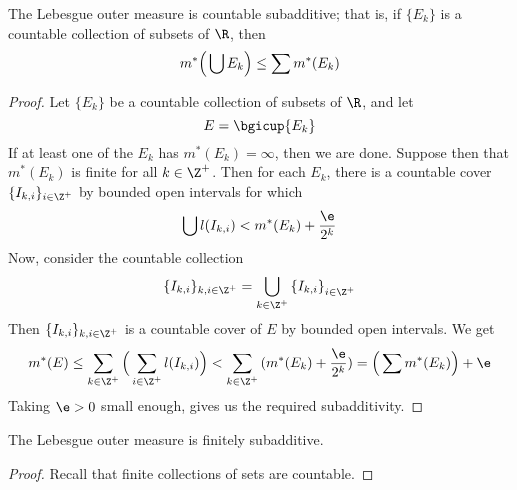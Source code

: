 \begin{lemma}\label{8.2.6}
    The Lebesgue outer measure is countable subadditive; that is, if $\{E_k\}$
    is a countable collection of subsets of $\R$, then
    \begin{equation*}
        m^\ast\Big{(} \bigcup{E_k} \Big{)} \leq \sum{m^\ast(E_k)}
    \end{equation*}
\end{lemma}
\begin{proof}
    Let $\{E_k\}$ be a countable collection of subsets of $\R$, and let
    \begin{equation*}
        E=\bgicup{E_k}
    \end{equation*}
    If at least one of the $E_k$ has  $m^\ast(E_k)=\infty$, then we are done.
    Suppose then that $m^\ast(E_k)$ is finite for all $k \in \Z^+$. Then for
    each  $E_k$, there is a countable cover  $\{I_{k,i}\}_{i \in \Z^+}$ by
    bounded open intervals for which
    \begin{equation*}
        \bigcup{l(I_{k,i})}<m^\ast(E_k)+\frac{\e}{2^k}
    \end{equation*}
    Now, consider the countable collection
    \begin{equation*}
        \{I_{k,i}\}_{k,i \in \Z^+}=\bigcup_{k \in \Z^+}{\{I_{k,i}\}}_{i \in \Z^+}
    \end{equation*}
    Then $\{I_{k,i}\}_{k,i \in \Z^+}$ is a countable cover of $E$ by bounded
    open intervals. We get
    \begin{equation*}
        m^\ast(E) \leq
        \sum_{k \in \Z^+}{\Big{(} \sum_{i \in \Z^+}{l(I_{k,i})} \Big{)}}<
        \sum_{k \in \Z^+}{(m^\ast(E_k)+\frac{\e}{2^k})}=
        \Big{(} \sum{m^\ast(E_k)} \Big{)}+\e
    \end{equation*}
    Taking $\e>0$ small enough, gives us the required subadditivity.
\end{proof}
\begin{corollary}
    The Lebesgue outer measure is finitely subadditive.
\end{corollary}
\begin{proof}
    Recall that finite collections of sets are countable.
\end{proof}
